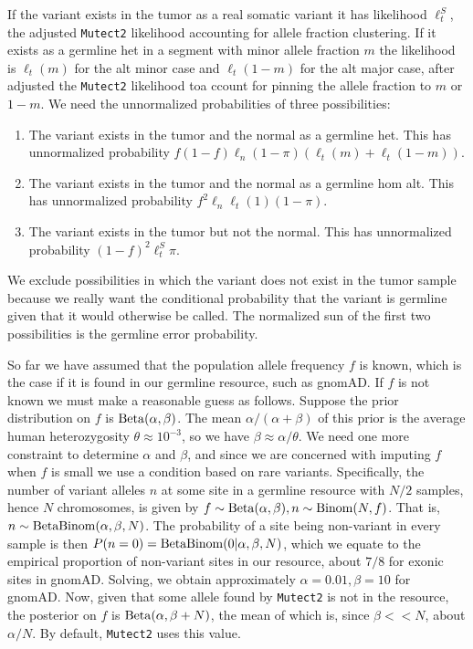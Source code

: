 \documentclass[nofootinbib,amssymb,amsmath]{revtex4}
\newcommand{\code}[1]{\texttt{#1}}
\begin{document}
If the variant exists in the tumor as a real somatic variant it has likelihood $\ell^S_t$, the adjusted \code{Mutect2} likelihood accounting for allele fraction clustering.  If it exists as a germline het in a segment with minor allele fraction $m$ the likelihood is $\ell_t(m)$ for the alt minor case and $\ell_t(1-m)$ for the alt major case, after adjusted the \code{Mutect2} likelihood toa ccount for pinning the allele fraction to $m$ or $1-m$.  We need the unnormalized probabilities of three possibilities:
\begin{enumerate}
\item The variant exists in the tumor and the normal as a germline het.  This has unnormalized probability $f(1-f) \ell_n (1 - \pi) \left( \ell_t(m) + \ell_t(1 - m) \right)$.
\item The variant exists in the tumor and the normal as a germline hom alt.  This has unnormalized probability $f^2 \ell_n \ell_t(1) (1 - \pi)$.
\item The variant exists in the tumor but not the normal.  This has unnormalized probability $(1-f)^2 \ell^S_t \pi$.
\end{enumerate}

We exclude possibilities in which the variant does not exist in the tumor sample because we really want the conditional probability that the variant is germline given that it would otherwise be called.  The normalized sun of the first two possibilities is the germline error probability.

So far we have assumed that the population allele frequency $f$ is known, which is the case if it is found in our germline resource, such as gnomAD.  If $f$ is not known we must make a reasonable guess as follows.  Suppose the prior distribution on $f$ is ${\rm Beta}(\alpha, \beta)$.  The mean $\alpha/(\alpha +\beta)$ of this prior is the average human heterozygosity $\theta \approx 10^{-3}$, so we have $\beta \approx \alpha / \theta$.  We need one more constraint to determine $\alpha$ and $\beta$, and since we are concerned with imputing $f$ when $f$ is small we use a condition based on rare variants.  Specifically, the number of variant alleles $n$ at some site in a germline resource with $N/2$ samples, hence $N$ chromosomes, is given by $f \sim {\rm Beta}(\alpha, \beta), n \sim {\rm Binom}(N,f)$.  That is, $n \sim {\rm BetaBinom}(\alpha, \beta, N)$.  The probability of a site being non-variant in every sample is then $P(n = 0) = {\rm BetaBinom}(0 | \alpha, \beta, N)$, which we equate to the empirical proportion of non-variant sites in our resource, about $7/8$ for exonic sites in gnomAD.  Solving, we obtain approximately $\alpha = 0.01, \beta = 10$ for gnomAD.  Now, given that some allele found by \code{Mutect2} is not in the resource, the posterior on $f$ is ${\rm Beta}(\alpha, \beta + N)$, the mean of which is, since $\beta << N$, about $\alpha / N$.  By default, \code{Mutect2} uses this value.
\end{document}
